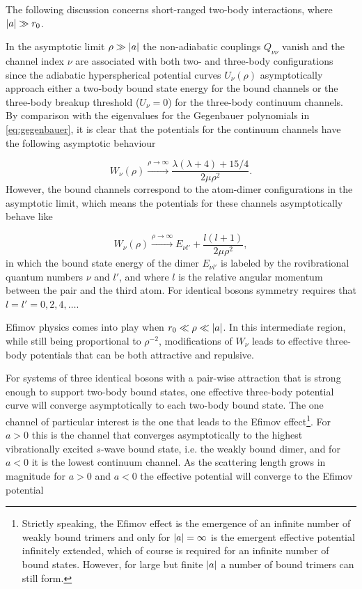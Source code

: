 The following discussion concerns short-ranged two-body interactions, where $\lvert a\rvert\gg r_0$. 

In the asymptotic limit $\rho \gg \lvert a\rvert$ the non-adiabatic couplings $Q_{\nu \nu}$ vanish and the channel index $\nu$ are associated with both two- and three-body configurations since the adiabatic hyperspherical potential curves $U_{\nu}(\rho)$ asymptotically approach either a two-body bound state energy for the bound channels or the three-body breakup threshold ($U_{\nu}=0$) for the three-body continuum channels.  By comparison with the eigenvalues for the Gegenbauer polynomials in \eqref{eq:gegenbauer}, it is clear that the potentials for the continuum channels have the following asymptotic behaviour 

\begin{equation}
W_{\nu}(\rho)  \xrightarrow{ \rho \to \infty} \frac{\lambda(\lambda+4)+15/4}{2\mu \rho^2}.
\end{equation}
However, the bound channels correspond to the atom-dimer configurations in the asymptotic limit, which means the potentials for these channels asymptotically behave like

\begin{equation}
W_{\nu}(\rho)  \xrightarrow{ \rho \to \infty} E_{\nu l'} +\frac{l(l+1)}{2\mu \rho^2},
\end{equation} 
in which the bound state energy of the dimer $E_{\nu l'}$ is labeled by the rovibrational quantum numbers $\nu$ and $l'$, and where $l$ is the relative angular momentum between the pair and the third atom. For identical bosons symmetry requires that $l=l'=0,2,4,\ldots$.

Efimov physics comes into play when $r_0 \ll \rho \ll \lvert a\rvert$. In this intermediate region, while still being proportional to $\rho^{-2}$, modifications of $W_{\nu}$ leads to effective three-body potentials that can be both attractive and repulsive. 

For systems of three identical bosons with a pair-wise attraction that is strong enough to support two-body bound states, one effective three-body potential curve will converge asymptotically to each two-body bound state. The one channel of particular interest is the one that leads to the Efimov effect\footnote{Strictly speaking, the Efimov effect is the emergence of an infinite number of weakly bound trimers and only for $\lvert a\rvert = \infty$ is the emergent effective potential infinitely extended, which of course is required for an infinite number of bound states. However, for large but finite $\lvert a\rvert$ a number of bound trimers can still form.}. For $a>0$ this is the channel that converges asymptotically to the highest vibrationally excited $s$-wave bound state, i.e. the weakly bound dimer, and for $a<0$ it is the lowest continuum channel.  As the scattering length grows in magnitude for $a>0$ and $a<0$ the effective potential will converge to the Efimov potential 

